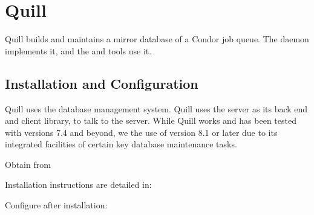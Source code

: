 \section{\label{sec:Quill}Quill}

Quill builds and maintains a mirror database of a Condor job queue.
The  daemon implements it,
and the  and  tools use it.

\subsection{\label{sec:Quill-Installation}Installation and Configuration}

Quill uses the  database management system.
Quill uses the  server as its back end
and client library, 
 to talk to the server.
While Quill works and has been tested with 
versions 7.4 and beyond, we  the use of version 
8.1 or 
later due to its integrated facilities of certain key database maintenance 
tasks. 

Obtain  from


Installation instructions are detailed in:

Configure  after installation:

